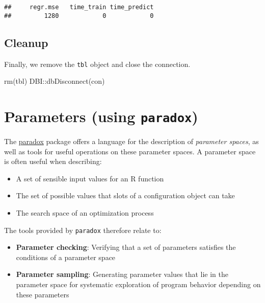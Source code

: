 \documentclass[
]{scrbook}
\newenvironment{Shaded}{\begin{snugshade}}{\end{snugshade}}
\newcommand{\FunctionTok}[1]{\textcolor[rgb]{0.00,0.00,0.00}{#1}}
\newcommand{\NormalTok}[1]{#1}
\newcommand{\SpecialCharTok}[1]{\textcolor[rgb]{0.00,0.00,0.00}{#1}}
\providecommand{\tightlist}{%
  \setlength{\itemsep}{0pt}\setlength{\parskip}{0pt}}
\renewenvironment{Shaded} {\begin{snugshade}\small} {\end{snugshade}}
\begin{document}
\begin{verbatim}
##     regr.mse   time_train time_predict 
##         1280            0            0
\end{verbatim}

\hypertarget{cleanup}{%
\subsection{Cleanup}\label{cleanup}}

Finally, we remove the \texttt{tbl} object and close the connection.

\begin{Shaded}
\begin{Highlighting}[]
\FunctionTok{rm}\NormalTok{(tbl)}
\NormalTok{DBI}\SpecialCharTok{::}\FunctionTok{dbDisconnect}\NormalTok{(con)}
\end{Highlighting}
\end{Shaded}

\hypertarget{paradox}{%
\section{\texorpdfstring{Parameters (using \texttt{paradox})}{Parameters (using paradox)}}\label{paradox}}

The \href{https://paradox.mlr-org.com}{paradox} package offers a language for the description of \emph{parameter spaces}, as well as tools for useful operations on these parameter spaces.
A parameter space is often useful when describing:

\begin{itemize}
\tightlist
\item
  A set of sensible input values for an R function
\item
  The set of possible values that slots of a configuration object can take
\item
  The search space of an optimization process
\end{itemize}

The tools provided by \texttt{paradox} therefore relate to:

\begin{itemize}
\tightlist
\item
  \textbf{Parameter checking}: Verifying that a set of parameters satisfies the conditions of a parameter space
\item
  \textbf{Parameter sampling}: Generating parameter values that lie in the parameter space for systematic exploration of program behavior depending on these parameters
\end{itemize}
\end{document}
